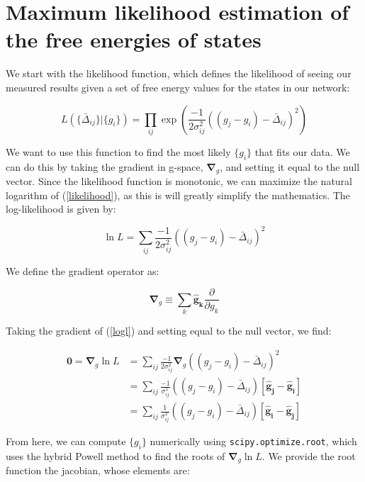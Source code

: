 \section{Maximum likelihood estimation of the free energies of states}

We start with the likelihood function, which defines the likelihood of
seeing our measured results given a set of free energy values for the
states in our network:

\begin{equation}
  L(\{\bar{\Delta}_{ij}\} | \{g_i\}) = \prod_{ij} \exp \left(
  \frac{-1}{2 \sigma^2_{ij}} ((g_j - g_i) - \bar{\Delta}_{ij})^2 \right)
  \label{likelihood}
\end{equation}

We want to use this function to find the most likely $\{g_i\}$ that
fits our data. We can do this by taking the gradient in g-space,
$\boldsymbol{\nabla}_g$, and setting it equal to the null
vector. Since the likelihood function is monotonic, we can maximize
the natural logarithm of (\ref{likelihood}), as this is will greatly
simplify the mathematics. The log-likelihood is given by:

\begin{equation}
  \ln{L} = \sum_{ij} \frac{-1}{2\sigma^2_{ij}} ((g_j - g_i) -
  \bar{\Delta}_{ij})^2
  \label{logl}
\end{equation}

We define the gradient operator as:

\begin{equation}
  \boldsymbol \nabla_g \equiv \sum_k \boldsymbol{\hat{g}_k}
  \frac{\partial}{\partial g_k}
\end{equation}

Taking the gradient of (\ref{logl}) and setting equal to the null
vector, we find:

\begin{align}
  \boldsymbol{0} = \boldsymbol \nabla_g \ln L &= \sum_{ij}
  \frac{-1}{2\sigma^2_{ij}} \boldsymbol \nabla_g ((g_j - g_i) -
  \bar{\Delta}_{ij})^2 \\
  &= \sum_{ij} \frac{-1}{\sigma^2_{ij}}
  ((g_j - g_i) - \bar{\Delta}_{ij})\left[ \boldsymbol{\hat g_j}  -
    \boldsymbol{\hat g_i} \right]  \\
   &= \sum_{ij} \frac{1}{\sigma^2_{ij}}
  ((g_j - g_i) - \bar{\Delta}_{ij})\left[ \boldsymbol{\hat g_i}  -
    \boldsymbol{\hat g_j} \right] 
\end{align}

From here, we can compute $\{g_i\}$ numerically using
\verb|scipy.optimize.root|, which uses the hybrid Powell method to
find the roots of $\boldsymbol \nabla_g \ln L$. We provide the root
function the jacobian, whose elements are:

